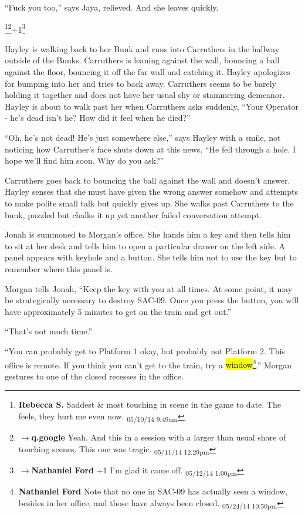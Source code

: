 ``Fuck you too,'' says Jaya, relieved.  And she leaves quickly.


\footnote{\textbf{Rebecca S. }Saddest \& most touching in scene in the game to date.  The feels, they hurt me even now. \textsubscript{05/10/14 9:49am}}\footnote{$\rightarrow$\textbf{q.google }Yeah.  And this in a session with a larger than usual share of touching scenes.  This one was tragic. \textsubscript{05/11/14 12:29pm}}+1\footnote{$\rightarrow$\textbf{Nathaniel Ford }+1 I'm glad it came off. \textsubscript{05/12/14 1:00pm}}

Hayley is walking back to her Bunk and runs into Carruthers in the hallway outside of the Bunks.  Carruthers is leaning against the wall, bouncing a ball against the floor, bouncing it off the far wall and catching it.  Hayley apologizes for bumping into her and tries to back away.  Carruthers seems to be barely holding it together and does not have her usual shy or stammering demeanor.  Hayley is about to walk past her when Carruthers asks suddenly, ``Your Operator - he's dead isn't he?  How did it feel when he died?''

``Oh, he's not dead!  He's just somewhere else,'' says Hayley with a smile, not noticing how Carruther's face shuts down at this news.  ``He fell through a hole.  I hope we'll find him soon.  Why do you ask?''

Carruthers goes back to bouncing the ball against the wall and doesn't answer.  Hayley senses that she must have given the wrong answer somehow and attempts to make polite small talk but quickly gives up.  She walks past Carruthers to the bunk, puzzled but chalks it up yet another failed conversation attempt.



Jonah is summoned to Morgan's office.  She hands him a key and then tells him to sit at her desk and tells him to open a particular drawer on the left side.  A panel appears with keyhole and a button.  She tells him not to use the key but to remember where this panel is.

Morgan tells Jonah, ``Keep the key with you at all times.  At some point, it may be strategically necessary to destroy SAC-09.  Once you press the button, you will have approximately 5 minutes to get on the train and get out.''

``That's not much time.''

``You can probably get to Platform 1 okay, but probably not Platform 2.  This office is remote.  If you think you can't get to the train, try a \hl{window}\footnote{\textbf{Nathaniel Ford }Note that no one in SAC-09 has actually seen a window, besides in her office, and those have always been closed. \textsubscript{05/24/14 10:50pm}}.'' Morgan gestures to one of the closed recesses in the office. 

